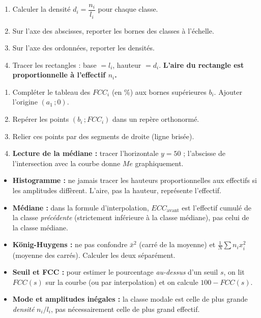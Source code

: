 \documentclass[11pt]{article}
\newcommand{\cle}[1]{{\popxbold\color{popdark}#1}}
\begin{document}
\begin{methode}
\begin{enumerate}
\item Calculer la \cle{densité} $d_i = \dfrac{n_i}{l_i}$ pour chaque classe.
\item Sur l'axe des abscisses, reporter les bornes des classes à l'échelle.
\item Sur l'axe des ordonnées, reporter les densités.
\item Tracer les rectangles : base $= l_i$, hauteur $= d_i$. \textbf{L'aire du rectangle est proportionnelle à l'effectif $n_i$.}
\end{enumerate}
\end{methode}

\begin{methode}
\begin{enumerate}
\item Compléter le tableau des $FCC_i$ (en \%) aux bornes supérieures $b_i$. Ajouter l'origine $(a_1\,;0)$.
\item Repérer les points $(b_i\,; FCC_i)$ dans un repère orthonormé.
\item Relier ces points par des segments de droite (ligne brisée).
\item \textbf{Lecture de la médiane :} tracer l'horizontale $y=50$ ; l'abscisse de l'intersection avec la courbe donne $Me$ graphiquement.
\end{enumerate}
\end{methode}

\begin{attention}
\begin{itemize}
\item \textbf{Histogramme :} ne jamais tracer les hauteurs proportionnelles aux effectifs si les amplitudes diffèrent. L'aire, pas la hauteur, représente l'effectif.
\item \textbf{Médiane :} dans la formule d'interpolation, $ECC_{\text{avant}}$ est l'effectif cumulé de la classe \emph{précédente} (strictement inférieure à la classe médiane), pas celui de la classe médiane.
\item \textbf{König-Huygens :} ne pas confondre $\bar{x}^2$ (carré de la moyenne) et $\frac{1}{N}\sum n_i x_i^2$ (moyenne des carrés). Calculer les deux séparément.
\item \textbf{Seuil et FCC :} pour estimer le pourcentage \emph{au-dessus} d'un seuil $s$, on lit $FCC(s)$ sur la courbe (ou par interpolation) et on calcule $100 - FCC(s)$.
\item \textbf{Mode et amplitudes inégales :} la classe modale est celle de plus grande \emph{densité} $n_i/l_i$, pas nécessairement celle de plus grand effectif.
\end{itemize}
\end{attention}
\end{document}
